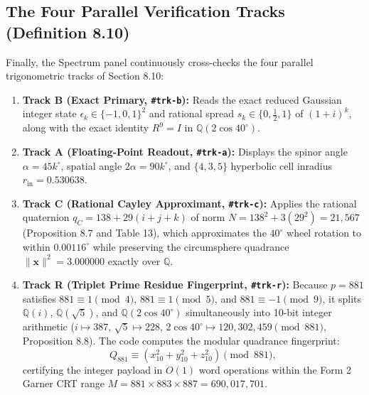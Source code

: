 \documentclass[11pt, a4paper]{article}
\begin{document}
\subsection{The Four Parallel Verification Tracks (Definition 8.10)}
Finally, the Spectrum panel continuously cross-checks the four parallel trigonometric tracks of Section 8.10:
\begin{enumerate}
    \item \textbf{Track B (Exact Primary, \texttt{\#trk-b}):} Reads the exact reduced Gaussian integer state $\epsilon_k \in \{-1,0,1\}^2$ and rational spread $s_k \in \{0, \frac{1}{2}, 1\}$ of $(1+i)^k$, along with the exact identity $R^9 = I$ in $\mathbb{Q}(2\cos 40^\circ)$.
    \item \textbf{Track A (Floating-Point Readout, \texttt{\#trk-a}):} Displays the spinor angle $\alpha = 45k^\circ$, spatial angle $2\alpha = 90k^\circ$, and $\{4,3,5\}$ hyperbolic cell inradius $r_{\text{in}} = 0.530638$.
    \item \textbf{Track C (Rational Cayley Approximant, \texttt{\#trk-c}):} Applies the rational quaternion $q_C = 138 + 29(i+j+k)$ of norm $N = 138^2 + 3(29^2) = 21,567$ (Proposition 8.7 and Table 13), which approximates the $40^\circ$ wheel rotation to within $0.00116^\circ$ while preserving the circumsphere quadrance $\|\mathbf{x}\|^2 = 3.000000$ exactly over $\mathbb{Q}$.
    \item \textbf{Track R (Triplet Prime Residue Fingerprint, \texttt{\#trk-r}):} Because $p = 881$ satisfies $881 \equiv 1 \pmod 4$, $881 \equiv 1 \pmod 5$, and $881 \equiv -1 \pmod 9$, it splits $\mathbb{Q}(i)$, $\mathbb{Q}(\sqrt{5})$, and $\mathbb{Q}(2\cos 40^\circ)$ simultaneously into 10-bit integer arithmetic ($i \mapsto 387$, $\sqrt{5} \mapsto 228$, $2\cos 40^\circ \mapsto 120, 302, 459 \pmod{881}$, Proposition 8.8). The code computes the modular quadrance fingerprint:
    \begin{equation}
    Q_{881} \equiv \left(x_{10}^2 + y_{10}^2 + z_{10}^2\right) \pmod{881},
    \end{equation}
    certifying the integer payload in $O(1)$ word operations within the Form 2 Garner CRT range $M = 881 \times 883 \times 887 = 690,017,701$.
\end{enumerate}
\end{document}
